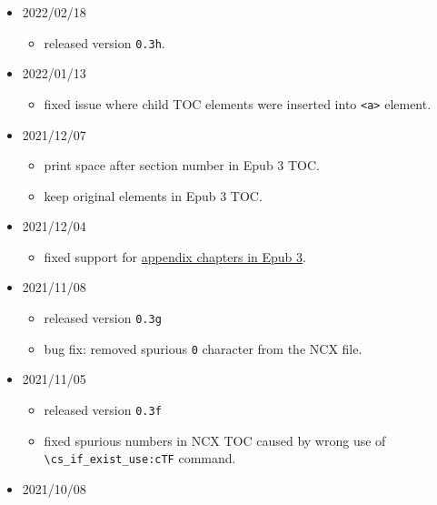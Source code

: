 \begin{itemize}
  \begin{itemize}
  \tightlist
  \item
    print \texttt{\textbackslash{}subsubsection} in the Epub TOC.
  \end{itemize}
\item
  2022/02/18

  \begin{itemize}
  \tightlist
  \item
    released version \texttt{0.3h}.
  \end{itemize}
\item
  2022/01/13

  \begin{itemize}
  \tightlist
  \item
    fixed issue where child TOC elements were inserted into
    \texttt{\textless{}a\textgreater{}} element.
  \end{itemize}
\item
  2021/12/07

  \begin{itemize}
  \tightlist
  \item
    print space after section number in Epub 3 TOC.
  \item
    keep original elements in Epub 3 TOC.
  \end{itemize}
\item
  2021/12/04

  \begin{itemize}
  \tightlist
  \item
    fixed support for
    \href{https://github.com/michal-h21/tex4ebook/issues/85}{appendix
    chapters in Epub 3}.
  \end{itemize}
\item
  2021/11/08

  \begin{itemize}
  \tightlist
  \item
    released version \texttt{0.3g}
  \item
    bug fix: removed spurious \texttt{0} character from the NCX file.
  \end{itemize}
\item
  2021/11/05

  \begin{itemize}
  \tightlist
  \item
    released version \texttt{0.3f}
  \item
    fixed spurious numbers in NCX TOC caused by wrong use of
    \texttt{\textbackslash{}cs\_if\_exist\_use:cTF} command.
  \end{itemize}
\item
  2021/10/08


\end{itemize}
